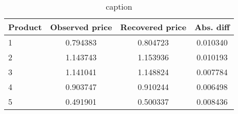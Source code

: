 \begin{table}[H]
\centering
\caption{{{caption}}}
\begin{tabular}{lccc}
\toprule
Product & Observed price & Recovered price & Abs. diff \\
\midrule
1 & 0.794383 & 0.804723 & 0.010340 \\
2 & 1.143743 & 1.153936 & 0.010193 \\
3 & 1.141041 & 1.148824 & 0.007784 \\
4 & 0.903747 & 0.910244 & 0.006498 \\
5 & 0.491901 & 0.500337 & 0.008436 \\
\bottomrule
\end{tabular}
\label{tab:q15_recover_c1t1}
\end{table}
